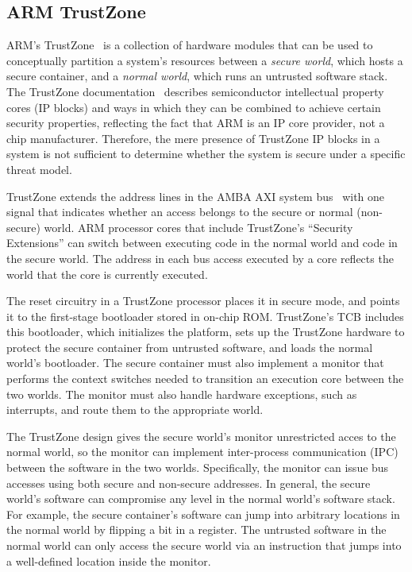 \subsection{ARM TrustZone}

ARM's TrustZone~\cite{alves2004trustzone} is a collection of hardware modules
that can be used to conceptually partition a system's resources between a
\textit{secure world}, which hosts a secure container, and a \textit{normal
world}, which runs an untrusted software stack. The TrustZone
documentation~\cite{arm2009trustzone} describes semiconductor intellectual
property cores (IP blocks) and ways in which they can be combined to achieve
certain security properties, reflecting the fact that ARM is an IP core
provider, not a chip manufacturer. Therefore, the mere presence of TrustZone IP
blocks in a system is not sufficient to determine whether the system is secure
under a specific threat model.

TrustZone extends the address lines in the AMBA AXI system
bus~\cite{arm2004ambaxi} with one signal that indicates whether an access
belongs to the secure or normal (non-secure) world. ARM processor cores that
include TrustZone's ``Security Extensions'' can switch between executing code
in the normal world and code in the secure world. The address in each bus
access executed by a core reflects the world that the core is currently
executed.

The reset circuitry in a TrustZone processor places it in secure mode, and
points it to the first-stage bootloader stored in on-chip ROM. TrustZone's TCB
includes this bootloader, which initializes the platform, sets up the TrustZone
hardware to protect the secure container from untrusted software, and loads the
normal world's bootloader. The secure container must also implement a monitor
that performs the context switches needed to transition an execution core
between the two worlds. The monitor must also handle hardware exceptions, such
as interrupts, and route them to the appropriate world.

The TrustZone design gives the secure world's monitor unrestricted acces to the
normal world, so the monitor can implement inter-process communication (IPC)
between the software in the two worlds. Specifically, the monitor can issue
bus accesses using both secure and non-secure addresses. In general, the secure
world's software can compromise any level in the normal world's software stack.
For example, the secure container's software can jump into arbitrary locations
in the normal world by flipping a bit in a register. The untrusted software in
the normal world can only access the secure world via an instruction that jumps
into a well-defined location inside the monitor.

